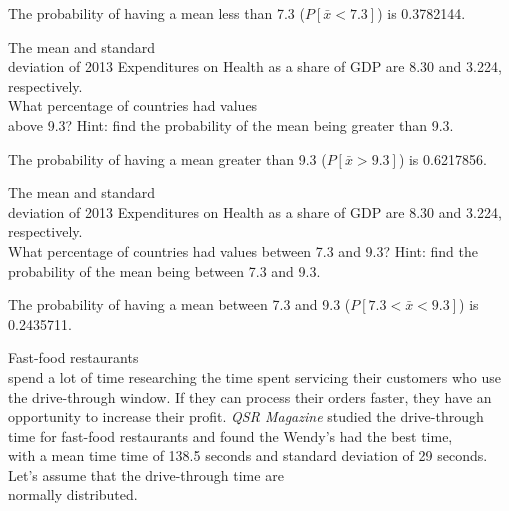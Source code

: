 \documentclass[11pt, chapterprefix=true]{scrbook}\usepackage[]{graphicx}\usepackage[]{color}
\begin{document}
\begin{exercises}
\begin{exercise}
	  \end{exercise}
	  \vspace{2cm}
	  \begin{solution}   %



    The probability of having a mean less than 7.3 ($P[ \bar{x} < 7.3 ]$) is 0.3782144.

	\end{solution}

			\begin{exercise}  %

	  The mean and standard \\ deviation of 2013 Expenditures on Health as a share of GDP are 8.30 and 3.224, respectively.  \\ What percentage of countries had values \\ above 9.3?   Hint: find the probability of the mean being greater than 9.3.

	  \end{exercise}
	  \vspace{2cm}
	  \begin{solution}    %



    The probability of having a mean greater than 9.3 ($P[ \bar{x} > 9.3 ]$) is 0.6217856.

	\end{solution}

  		\begin{exercise}  %

	  The mean and standard \\ deviation of 2013 Expenditures on Health as a share of GDP are 8.30 and 3.224, respectively.  \\ What percentage of countries had values between 7.3 and 9.3?   Hint: find the probability of the mean being between 7.3 and  9.3.

	  \end{exercise}
	  \begin{solution}    %



    The probability of having a mean between 7.3 and  9.3 ($P[ 7.3 < \bar{x} < 9.3 ]$) is 0.2435711.

	\end{solution}
	
\begin{exercise}   %



Fast-food restaurants \\ spend a lot of time researching the time spent servicing their customers who use the drive-through window.  If they can process their orders faster, they have an opportunity to increase their profit.  \textit{QSR Magazine} studied the drive-through time for fast-food restaurants and found the Wendy's had the best time, \\ with a mean  time time of 138.5 seconds and standard deviation of 29 seconds.  Let's assume that the drive-through time are \\ normally distributed. 


\end{exercise}
\end{exercises}
\end{document}
